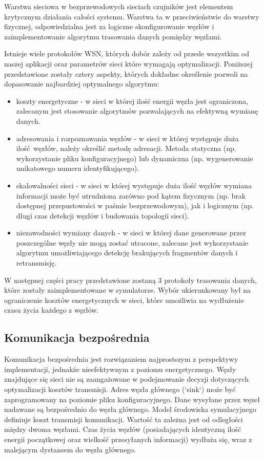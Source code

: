 \documentclass[a4paper,12pt,twoside,openany]{report}
\begin{document}
Warstwa sieciowa w bezprzewodowych sieciach czujników jest elementem krytycznym działania całości systemu.
Warstwa ta w przeciwieństwie do warstwy fizycznej, odpowiedzialna jest za logiczne skonfigurowanie węzłów i
zaimplementowanie algorytmu trasowania danych pomiędzy węzłami.

Istnieje wiele protokołów WSN, których dobór zależy od przede wszystkim od naszej aplikacji oraz
parametrów sieci które wymagają optymalizacji. Poniższej przedstawione zostały cztery aspekty, których dokładne określenie pozwoli
na dopasowanie najbardziej optymalnego algorytmu:

\begin{itemize}
 \item koszty energetyczne - w sieci w której ilość energii węzła jest ograniczona, zalecanym jest stosowanie algorytmów pozwalających
       na efektywną wymianę danych.
 \item adresowania i rozpoznawania węzłów - w sieci w której występuje duża ilość węzłów, należy określić metodę adresacji.
       Metoda statyczna (np. wykorzystanie pliku konfiguracyjnego) lub dynamiczna (np. wygenerowanie unikatowego numeru identyfikującego).
 \item skalowalności sieci - w sieci w której występuje duża ilość węzłów wymiana informacji może być utrudniona zarówno pod kątem fizycznym
       (np. brak dostępnej przepustowości w paśmie bezprzewodowym), jak i logicznym (np. długi czas detekcji węzłów i budowania topologii sieci).
 \item niezawodności wymiany danych - w sieci w której dane generowane przez poszczególne węzły nie mogą zostać utracone, zalecane jest wykorzystanie
       algorytmu umożliwiającego detekcję brakujących fragmentów danych i retransmisję.
\end{itemize}

W następnej części pracy przedstawione zostaną 3 protokoły trasowania danych, które zostały zaimplementowane w symulatorze.
Wybór ukierunkowany był na ograniczenie kosztów energetycznych w sieci, które umożliwia na wydłużenie czasu życia każdego z węzłów.

\subsection{Komunikacja bezpośrednia}

Komunikacja bezpośrednia jest rozwiązaniem najprostszym z perspektywy implementacji, jednakże nieefektywnym z poziomu energetycznego. 
Węzły znajdujące się sieci nie są zaangażowane w podejmowanie decyzji dotyczących optymalizacji kosztów transmisji. 
Adres węzła głównego (`sink`) może być zaprogramowany na poziomie pliku konfiguracyjnego.
Dane wysyłane przez węzeł nadawane są bezpośrednio do węzła głównego.
Model środowiska symulacyjnego definiuje koszt transmisji komunikacji. Wartość ta zależna jest od odległości między dwoma węzłami.
Czas życia węzłów (posiadających identyczną ilość energii początkowej oraz wielkość przesyłanych informacji) wydłuża się, wraz z malejącym dystansem do węzła głównego.
\end{document}
